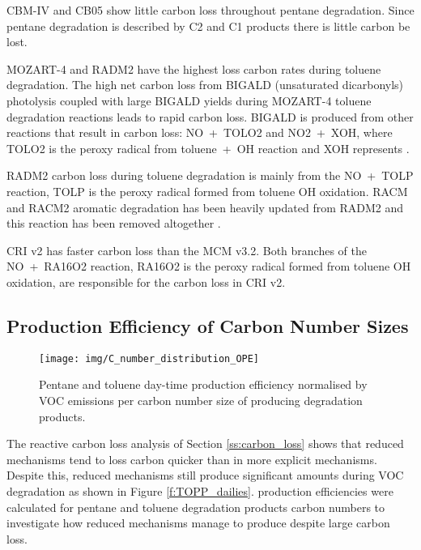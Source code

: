 CBM-IV and CB05 show little carbon loss throughout pentane degradation.
Since pentane degradation is described by C2 and C1 products there is little carbon be lost.

MOZART-4 and RADM2 have the highest loss carbon rates during toluene degradation.
The high net carbon loss from BIGALD (unsaturated dicarbonyls) photolysis coupled with large BIGALD yields during MOZART-4 toluene degradation reactions leads to rapid carbon loss.
BIGALD is produced from other reactions that result in carbon loss: \mbox{NO + TOLO2} and \mbox{NO2 + XOH}, where TOLO2 is the peroxy radical from \mbox{toluene + OH} reaction and XOH represents  \citep{Emmons:2010}.

RADM2 carbon loss during toluene degradation is mainly from the \mbox{NO + TOLP} reaction, TOLP is the peroxy radical formed from toluene OH oxidation.
RACM and RACM2 aromatic degradation has been heavily updated from RADM2 and this reaction has been removed altogether \citep{Stockwell:1997, Goliff:2013}.

CRI v2 has faster carbon loss than the MCM v3.2.
Both branches of the \mbox{NO + RA16O2} reaction, RA16O2 is the peroxy radical formed from toluene OH oxidation, are responsible for the carbon loss in CRI v2.

\subsection[Ox Production Efficiency of Carbon Number Sizes]{ Production Efficiency of Carbon Number Sizes} \label{ss:OPE}

\begin{figure}
    \centering
    \texttt{[image: img/C\_number\_distribution\_OPE]}
    \vspace{0mm}
    \caption{Pentane and toluene day-time  production efficiency normalised by VOC emissions per carbon number size of  producing degradation products.}
    \vspace{-4mm}
    \label{f:OPE}
\end{figure}

The reactive carbon loss analysis of Section \ref{ss:carbon_loss} shows that reduced mechanisms tend to loss carbon quicker than in more explicit mechanisms.
Despite this, reduced mechanisms still produce significant  amounts during VOC degradation as shown in Figure \ref{f:TOPP_dailies}.
 production efficiencies were calculated for pentane and toluene degradation products carbon numbers to investigate how reduced mechanisms manage to produce  despite large carbon loss.

